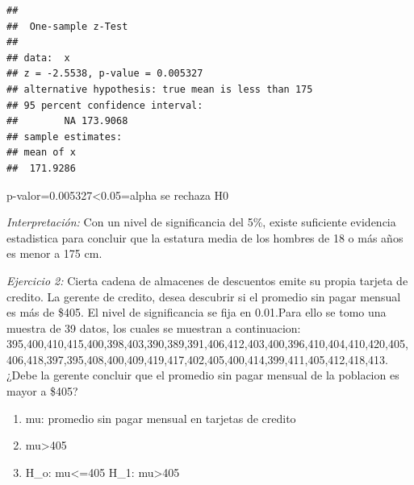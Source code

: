 \documentclass[
]{article}
\begin{document}
\begin{verbatim}
## 
##  One-sample z-Test
## 
## data:  x
## z = -2.5538, p-value = 0.005327
## alternative hypothesis: true mean is less than 175
## 95 percent confidence interval:
##        NA 173.9068
## sample estimates:
## mean of x 
##  171.9286
\end{verbatim}

p-valor=0.005327\textless0.05=alpha se rechaza H0

\emph{Interpretación:} Con un nivel de significancia del 5\%, existe
suficiente evidencia estadistica para concluir que la estatura media de
los hombres de 18 o más años es menor a 175 cm.

\emph{Ejercicio 2:} Cierta cadena de almacenes de descuentos emite su
propia tarjeta de credito. La gerente de credito, desea descubrir si el
promedio sin pagar mensual es más de \$405. El nivel de significancia se
fija en 0.01.Para ello se tomo una muestra de 39 datos, los cuales se
muestran a continuacion:
395,400,410,415,400,398,403,390,389,391,406,412,403,400,396,410,404,410,420,405,406,418,397,395,408,400,409,419,417,402,405,400,414,399,411,405,412,418,413.
¿Debe la gerente concluir que el promedio sin pagar mensual de la
poblacion es mayor a \$405?

\begin{enumerate}
\def\labelenumi{\arabic{enumi}.}
\item
  mu: promedio sin pagar mensual en tarjetas de credito
\item
  mu\textgreater405
\item
  H\_o: mu\textless=405 H\_1: mu\textgreater405
\end{enumerate}
\end{document}
